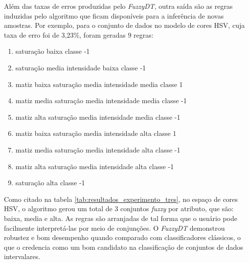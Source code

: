 Além das taxas de erros produzidas pelo \emph{FuzzyDT}, outra saída são as regras induzidas pelo algoritmo que ficam disponíveis para a inferência de novas amostras. Por exemplo, para o conjunto de dados no modelo de cores HSV, cuja taxa de erro foi de 3,23\%, foram geradas 9 regras:
\begin{enumerate}[itemsep=0mm]
\item {} saturação  baixa  classe  -1
\item {} saturação  media  intensidade  baixa  classe  -1
\item {} matiz  baixa  saturação  media  intensidade  media  classe  1
\item {} matiz  media  saturação  media  intensidade  media  classe  -1
\item {} matiz  alta  saturação  media  intensidade  media  classe  -1
\item {} matiz  baixa  saturação  media  intensidade  alta  classe  1
\item {} matiz  media  saturação  media  intensidade  alta  classe  -1
\item {} matiz  alta  saturação  media  intensidade  alta  classe  -1
\item {} saturação  alta  classe  -1
\end{enumerate}

Como citado na tabela \ref{tab:resultados_experimento_tres}, no espaço de cores HSV, o algoritmo gerou um total de 3 conjuntos \emph{fuzzy} por atributo, que são: baixa, media e alta. As regras são arranjadas de tal forma que o usuário pode facilmente interpretá-las por meio de conjunções. O \emph{FuzzyDT} demonstrou robustez e bom desempenho quando comparado com classificadores clássicos, o que o credencia como um bom candidato na classificação de conjuntos de dados intervalares.